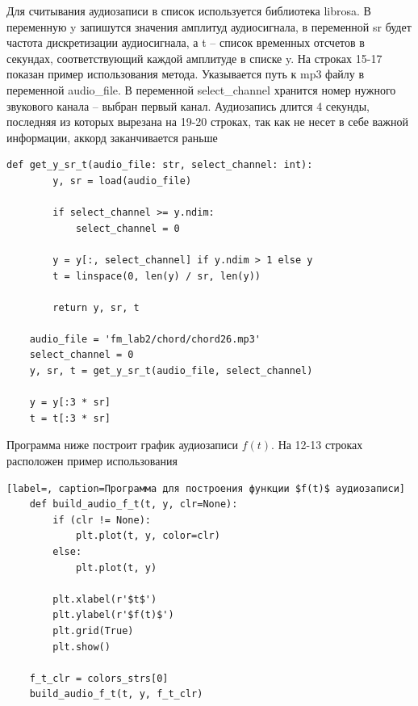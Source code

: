 \documentclass[a4paper, 16pt]{article}
\begin{document}
    \noindent Для считывания аудиозаписи в список используется библиотека librosa. В переменную y запишутся значения амплитуд аудиосигнала,
    в переменной sr будет частота дискретизации аудиосигнала, а t -- список временных отсчетов в секундах, соответствующий каждой амплитуде в списке y.
    На строках 15-17 показан пример использования метода. Указывается путь к mp3 файлу в переменной audio\_{file}. В переменной select\_{channel} хранится номер
    нужного звукового канала -- выбран первый канал. Аудиозапись длится 4 секунды, последняя из которых вырезана на 19-20 строках, так как не несет в себе
    важной информации, аккорд заканчивается раньше
    \begin{lstlisting}[label=mp3load, caption=Программа для считывания аудиозаписи в список]
    def get_y_sr_t(audio_file: str, select_channel: int):
        y, sr = load(audio_file)
    
        if select_channel >= y.ndim:
            select_channel = 0
    
        y = y[:, select_channel] if y.ndim > 1 else y
        t = linspace(0, len(y) / sr, len(y))
    
        return y, sr, t

    audio_file = 'fm_lab2/chord/chord26.mp3'
    select_channel = 0
    y, sr, t = get_y_sr_t(audio_file, select_channel)

    y = y[:3 * sr]
    t = t[:3 * sr]
    \end{lstlisting}


    \noindent Программа ниже построит график аудиозаписи $f(t)$. На 12-13 строках расположен пример
    использования
    \begin{lstlisting}[label=, caption=Программа для построения функции $f(t)$ аудиозаписи]
    def build_audio_f_t(t, y, clr=None):
        if (clr != None):
            plt.plot(t, y, color=clr)
        else:
            plt.plot(t, y)
    
        plt.xlabel(r'$t$')
        plt.ylabel(r'$f(t)$')
        plt.grid(True)
        plt.show()

    f_t_clr = colors_strs[0]
    build_audio_f_t(t, y, f_t_clr)
    \end{lstlisting}
\end{document}
